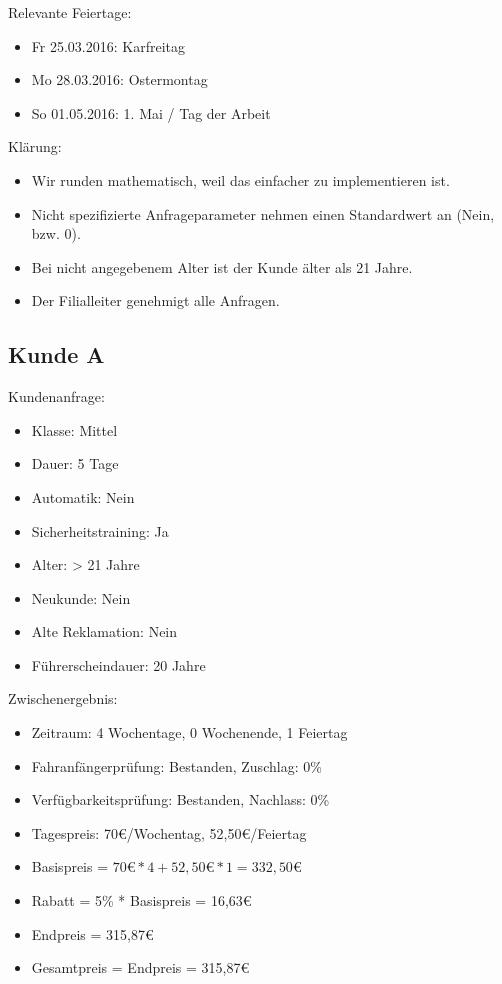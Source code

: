 Relevante Feiertage:
\begin{itemize}
	\item Fr 25.03.2016: Karfreitag
	\item Mo 28.03.2016: Ostermontag
	\item So 01.05.2016: 1. Mai / Tag der Arbeit
\end{itemize}

Klärung:
\begin{itemize}
	\item Wir runden mathematisch, weil das einfacher zu implementieren ist.
	\item Nicht spezifizierte Anfrageparameter nehmen einen Standardwert an (Nein, bzw. 0).
	\item Bei nicht angegebenem Alter ist der Kunde älter als 21 Jahre.
	\item Der Filialleiter genehmigt alle Anfragen.
\end{itemize}

\subsection{Kunde A}

Kundenanfrage:
\begin{itemize}
	\item Klasse: Mittel
	\item Dauer: 5 Tage
	\item Automatik: Nein
	\item Sicherheitstraining: Ja
	
	\item Alter: > 21 Jahre
	\item Neukunde: Nein
	\item Alte Reklamation: Nein
	\item Führerscheindauer: 20 Jahre
\end{itemize}

Zwischenergebnis:
\begin{itemize}
	\item Zeitraum: 4 Wochentage, 0 Wochenende, 1 Feiertag
	\item Fahranfängerprüfung: Bestanden, Zuschlag: 0\%
	\item Verfügbarkeitsprüfung: Bestanden, Nachlass: 0\%
	\item Tagespreis: 70€/Wochentag, 52,50€/Feiertag
	\item Basispreis = $70€ * 4 + 52,50€ * 1 = 332,50€$
	\item Rabatt = 5\% * Basispreis = 16,63€
	\item Endpreis = 315,87€
	\item Gesamtpreis = Endpreis = 315,87€
\end{itemize}

